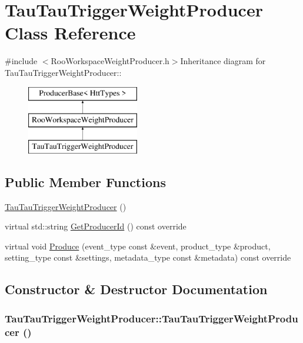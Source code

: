 \hypertarget{classTauTauTriggerWeightProducer}{
\section{TauTauTriggerWeightProducer Class Reference}
\label{classTauTauTriggerWeightProducer}
}


{\ttfamily \#include $<$RooWorkspaceWeightProducer.h$>$}Inheritance diagram for TauTauTriggerWeightProducer::\begin{figure}[H]
\begin{center}
\leavevmode
\includegraphics[height=3cm]{classTauTauTriggerWeightProducer}
\end{center}
\end{figure}
\subsection*{Public Member Functions}
\begin{DoxyCompactItemize}
\item 
\hyperlink{classTauTauTriggerWeightProducer_a122d0374980a320298b6cc4b5a84a755}{TauTauTriggerWeightProducer} ()
\item 
virtual std::string \hyperlink{classTauTauTriggerWeightProducer_adac32370050277ab831ce6db2a957e8d}{GetProducerId} () const override
\item 
virtual void \hyperlink{classTauTauTriggerWeightProducer_acea6bd34d07bef650fd48e5535ea0166}{Produce} (event\_\-type const \&event, product\_\-type \&product, setting\_\-type const \&settings, metadata\_\-type const \&metadata) const override
\end{DoxyCompactItemize}


\subsection{Constructor \& Destructor Documentation}
\hypertarget{classTauTauTriggerWeightProducer_a122d0374980a320298b6cc4b5a84a755}{
\subsubsection[{TauTauTriggerWeightProducer}]{\setlength{\rightskip}{0pt plus 5cm}TauTauTriggerWeightProducer::TauTauTriggerWeightProducer ()}}
\label{classTauTauTriggerWeightProducer_a122d0374980a320298b6cc4b5a84a755}


